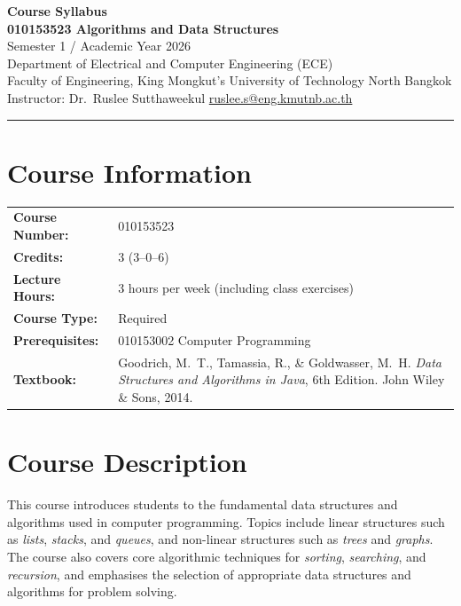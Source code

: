\documentclass[11pt,a4paper]{article}
\newcommand{\fieldlabel}[1]{\textbf{#1:}}
\begin{document}
\begin{center}
  {\Large\bfseries\color{kmutnbBlue} Course Syllabus}\\[2pt]
  {\large\bfseries 010153523 Algorithms and Data Structures}\\[2pt]
  {\normalsize Semester 1 / Academic Year 2026}\\[2pt]
  {\small Department of Electrical and Computer Engineering (ECE)}\\
  {\small Faculty of Engineering, King Mongkut's University of Technology North Bangkok}\\[4pt]
  {\small Instructor: Dr.\ Ruslee Sutthaweekul \quad\textbar\quad \href{mailto:ruslee.s@eng.kmutnb.ac.th}{ruslee.s@eng.kmutnb.ac.th}}
\end{center}

\noindent\rule{\linewidth}{0.4pt}

\section*{Course Information}
\begin{tabular}{@{}p{4.2cm}p{11cm}@{}}
  \fieldlabel{Course Number}   & 010153523 \\
  \fieldlabel{Credits}         & 3 (3--0--6) \\
  \fieldlabel{Lecture Hours}   & 3 hours per week (including class exercises) \\
  \fieldlabel{Course Type}     & Required \\
  \fieldlabel{Prerequisites}   & 010153002 Computer Programming \\
  \fieldlabel{Textbook}        & Goodrich, M.~T., Tamassia, R., \& Goldwasser, M.~H.
                                  \textit{Data Structures and Algorithms in Java}, 6th Edition.
                                  John Wiley \& Sons, 2014. \\
\end{tabular}

\section*{Course Description}
This course introduces students to the fundamental data structures and algorithms
used in computer programming. Topics include linear structures such as
\emph{lists}, \emph{stacks}, and \emph{queues}, and non-linear structures such as
\emph{trees} and \emph{graphs}. The course also covers core algorithmic techniques
for \emph{sorting}, \emph{searching}, and \emph{recursion}, and emphasises the
selection of appropriate data structures and algorithms for problem solving.
\end{document}
